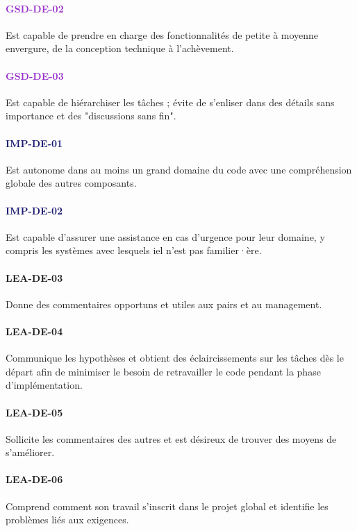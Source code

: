 \documentclass[a4paper, french, openany, 12pt]{book}
\newcommand\str[1]{\textcolor{DarkOrchid}{\textbf{\uppercase{gsd-{#1}}}}}
\newcommand\wis[1]{\textcolor{MidnightBlue}{\textbf{\uppercase{imp-{#1}}}}}
\newcommand\cha[1]{\textcolor{OliveGreen}{\textbf{\uppercase{lea-{#1}}}}}
\begin{document}
\begin{multicols}{2}
  \paragraph*{\str{de-02}}

  Est capable de prendre en charge des fonctionnalités de petite à moyenne envergure, de la conception technique à 
  l'achèvement.

  \paragraph*{\str{de-03}}

  Est capable de hiérarchiser les tâches ; évite de s'enliser dans des détails sans importance et des "discussions sans 
  fin".

  \paragraph*{\wis{de-01}}

  Est autonome dans au moins un grand domaine du code avec une compréhension globale des autres composants.

  \paragraph*{\wis{de-02}}

  Est capable d'assurer une assistance en cas d'urgence pour leur domaine, y compris les systèmes avec lesquels iel 
  n'est pas familier·ère.

  \paragraph*{\cha{de-03}}

  Donne des commentaires opportuns et utiles aux pairs et au management.

  \paragraph*{\cha{de-04}}

  Communique les hypothèses et obtient des éclaircissements sur les tâches dès le départ afin de minimiser le besoin de 
  retravailler le code pendant la phase d'implémentation.

  \paragraph*{\cha{de-05}}

  Sollicite les commentaires des autres et est désireux de trouver des moyens de s'améliorer.

  \paragraph*{\cha{de-06}}

  Comprend comment son travail s'inscrit dans le projet global et identifie les problèmes liés aux exigences.

\end{multicols}
\end{document}
